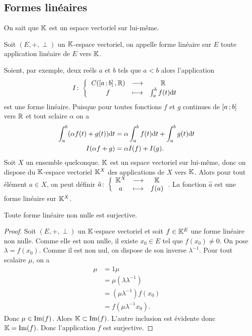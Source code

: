 \subsection{Formes linéaires}
On sait que \(\mathbb{K}\) est un espace vectoriel sur lui-même.
\begin{defdef}
  Soit \((E,+,\perp)\) un \(\mathbb{K}\)-espace vectoriel, on appelle forme linéaire sur \(E\) toute application linéaire de \(E\) vers \(\mathbb{K}\).
\end{defdef}

Soient, par exemple, deux reéls \(a\) et \(b\) tels que \(a<b\) alors l'application
\begin{equation}
  I\colon \left\{\begin{array}{ccc} \mathit{C}(\left[ a \, ;  b \right],\mathbb{R}) & \longrightarrow &\mathbb{R}\\ f & \longmapsto & \int_{a}^b f(t)\mathrm{d} t \end{array} \right.
\end{equation}
est une forme linéaire. Puisque pour toutes fonctions \(f\) et \(g\) continues de \(\left[ a \, ;  b \right]\) vers \(\mathbb{R}\) et tout sclaire \(\alpha\) on a
\begin{align}
  \int_{a}^b (\alpha f(t)+g(t))\mathrm{d} t &= \alpha \int_{a}^b f(t)\mathrm{d} t + \int_{a}^b g(t)\mathrm{d} t \\
  I(\alpha f+g)&=\alpha I(f)+I(g).
\end{align}
Soit \(X\) un ensemble quelconque. \(\mathbb{K}\) est un espace vectoriel sur lui-même, donc on dispose du \(\mathbb{K}\)-espace vectoriel \(\mathbb{K}^X\) des applications de \(X\) vers \(\mathbb{K}\). Alors pour tout élément \(a \in X\), on peut définir \(\hat{a}\colon \left\{\begin{array}{ccc} \mathbb{K}^X & \longrightarrow &\mathbb{K}\\ a & \longmapsto & f(a) \end{array} \right.\). La fonction \(\hat{a}\) est une forme linéaire sur \(\mathbb{K}^X\).
\begin{theo}
  Toute forme linéaire non nulle est surjective.
\end{theo}
\begin{proof}
  Soit \((E,+,\perp)\) un \(\mathbb{K}\)-espace vectoriel et soit \(f \in \mathbb{K}^E\) une forme linéaire non nulle. Comme elle est non nulle, il existe \(x_0 \in E\) tel que \(f(x_0)\neq 0\). On pose \(\lambda =f(x_0)\). Comme il est non nul, on dispose de son inverse \(\lambda^{-1}\). Pour tout scalaire \(\mu\), on a
  \begin{align}
    \mu & =1 \mu \\
        &= \mu (\lambda \lambda^{-1})\\
        &=(\mu\lambda^{-1})f(x_0)\\
        &=f(\mu\lambda^{-1}x_0).
  \end{align}
  Donc \(\mu \in \operatorname{Im}(f)\). Alors \(\mathbb{K} \subset \operatorname{Im}(f)\). L'autre inclusion est évidente donc \(\mathbb{K}=\operatorname{Im}(f)\). Donc l'application \(f\) est surjective.
\end{proof}

